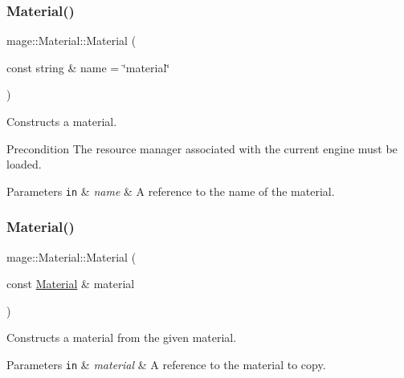 \subsubsection{\texorpdfstring{Material()}{Material()}\hspace{0.1cm}{\footnotesize\ttfamily [1/3]}}
{\footnotesize\ttfamily mage\+::\+Material\+::\+Material (\begin{DoxyParamCaption}\item[{const string \&}]{name = {\ttfamily \char`\"{}material\char`\"{}} }\end{DoxyParamCaption})\hspace{0.3cm}{\ttfamily [explicit]}}

Constructs a material.

\begin{DoxyPrecond}{Precondition}
The resource manager associated with the current engine must be loaded. 
\end{DoxyPrecond}

\begin{DoxyParams}[1]{Parameters}
\mbox{\tt in}  & {\em name} & A reference to the name of the material. \\
\hline
\end{DoxyParams}
\hypertarget{structmage_1_1_material_abed630412cdc4a6281389d128ec4b5f3}{}\label{structmage_1_1_material_abed630412cdc4a6281389d128ec4b5f3} 
\subsubsection{\texorpdfstring{Material()}{Material()}\hspace{0.1cm}{\footnotesize\ttfamily [2/3]}}
{\footnotesize\ttfamily mage\+::\+Material\+::\+Material (\begin{DoxyParamCaption}\item[{const \hyperlink{structmage_1_1_material}{Material} \&}]{material }\end{DoxyParamCaption})\hspace{0.3cm}{\ttfamily [default]}}

Constructs a material from the given material.


\begin{DoxyParams}[1]{Parameters}
\mbox{\tt in}  & {\em material} & A reference to the material to copy. \\
\hline
\end{DoxyParams}
\hypertarget{structmage_1_1_material_a41bfbc2bfa16e3694ac443d390b804c2}{}\label{structmage_1_1_material_a41bfbc2bfa16e3694ac443d390b804c2} 
